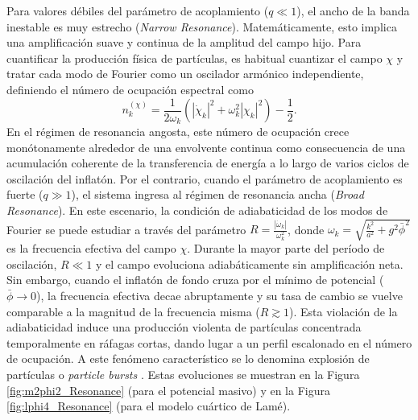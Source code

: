 Para valores débiles del parámetro de acoplamiento ($q \ll 1$), el ancho de la banda inestable es muy estrecho (\textit{Narrow Resonance}). Matemáticamente, esto implica una amplificación suave y continua de la amplitud del campo hijo. Para cuantificar la producción física de partículas, es habitual cuantizar el campo $\chi$ y tratar cada modo de Fourier como un oscilador armónico independiente, definiendo el número de ocupación espectral como
\begin{equation}
    n_k^{(\chi)} = \frac{1}{2 \omega_k} \left( \left| \dot{\chi}_k \right|^2 + \omega^2_k \left| \chi_k \right|^2 \right) - \frac{1}{2}.
\end{equation}
En el régimen de resonancia angosta, este número de ocupación crece monótonamente alrededor de una envolvente continua como consecuencia de una acumulación coherente de la transferencia de energía a lo largo de varios ciclos de oscilación del inflatón. Por el contrario, cuando el parámetro de acoplamiento es fuerte ($q \gg 1$), el sistema ingresa al régimen de resonancia ancha (\textit{Broad Resonance}). En este escenario, la condición de adiabaticidad de los modos de Fourier se puede estudiar a través del parámetro $\displaystyle R = \frac{\left| \dot{\omega}_k \right|}{\omega_k^2}$, donde $\displaystyle \omega_k = \sqrt{\frac{k^2}{a^2} + g^2 \bar{\phi}^2}$ es la frecuencia efectiva del campo $\chi$. Durante la mayor parte del período de oscilación, $R \ll 1$ y el campo evoluciona adiabáticamente sin amplificación neta. Sin embargo, cuando el inflatón de fondo cruza por el mínimo de potencial ($\bar{\phi} \to 0$), la frecuencia efectiva decae abruptamente y su tasa de cambio se vuelve comparable a la magnitud de la frecuencia misma ($R \gtrsim 1$). Esta violación de la adiabaticidad induce una producción violenta de partículas concentrada temporalmente en ráfagas cortas, dando lugar a un perfil escalonado en el número de ocupación. A este fenómeno característico se lo denomina explosión de partículas o \textit{particle bursts} \cite{Amin_2014, Kofman_1997}. Estas evoluciones se muestran en la Figura \ref{fig:m2phi2_Resonance} (para el potencial masivo) y en la Figura \ref{fig:lphi4_Resonance} (para el modelo cuártico de Lamé).

